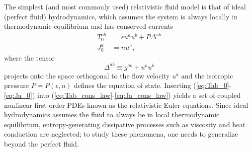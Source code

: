 \documentclass[%
notitlepage,
superscriptaddress,
nofootinbib,
amsmath,
amssymb,
aps,
twocolumn
]{revtex4-1}
\begin{document}
The simplest (and most commonly used) relativistic fluid model is that of ideal (perfect fluid) hydrodynamics, which assumes the system is always locally in thermodynamic equilibrium and has conserved currents
\begin{align}
T^{ab}_{0} &= \epsilon u^{a} u^{b} + P \Delta^{ab} \label{eq:Tab_0}\\
J^{a}_{0}  &= n u^{a}, \label{eq:Ja_0}
\end{align}
where the tensor
\begin{equation}
\Delta^{ab} \equiv g^{ab} + u^{a} u^{b}
\end{equation} 
projects onto the space orthogonal to the flow velocity $u^{a}$ and the isotropic pressure $P = P(\epsilon, n)$ defines the equation of state.  Inserting (\ref{eq:Tab_0}-\ref{eq:Ja_0}) into (\ref{eq:Tab_cons_law}-\ref{eq:Ja_cons_law}) yields a set of coupled nonlinear first-order PDEs known as the relativistic Euler equations.  Since ideal hydrodynamics assumes the fluid to always be in local thermodynamic equilibrium, entropy-generating dissipative processes such as viscosity and heat conduction are neglected; to study these phenomena, one needs to generalize beyond the perfect fluid.
\end{document}
